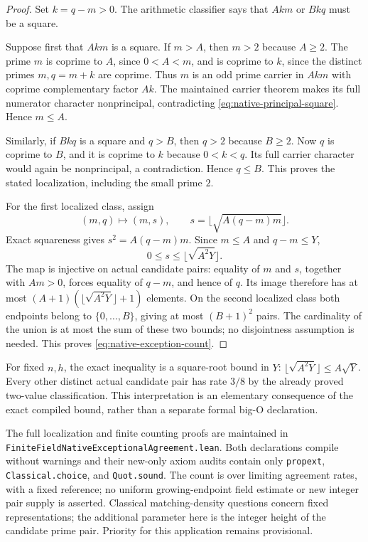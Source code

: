 \documentclass[11pt]{article}
\begin{document}
\begin{proof}
Set \(k=q-m>0\). The arithmetic classifier says that
\(Akm\) or \(Bkq\) must be a square.

Suppose first that \(Akm\) is a square. If \(m>A\), then \(m>2\)
because \(A\ge2\). The prime \(m\) is coprime to \(A\), since
\(0<A<m\), and is coprime to \(k\), since the distinct primes
\(m,q=m+k\) are coprime. Thus \(m\) is an odd prime carrier in
\(Akm\) with coprime complementary factor \(Ak\).
The maintained carrier theorem makes its full numerator character
nonprincipal, contradicting \eqref{eq:native-principal-square}.
Hence \(m\le A\).

Similarly, if \(Bkq\) is a square and \(q>B\), then \(q>2\)
because \(B\ge2\). Now \(q\) is coprime to \(B\), and it is
coprime to \(k\) because \(0<k<q\). Its full carrier character
would again be nonprincipal, a contradiction. Hence \(q\le B\).
This proves the stated localization, including the small prime \(2\).

For the first localized class, assign
\[
                  (m,q)\longmapsto(m,s),\qquad
                  s=\lfloor\sqrt{A(q-m)m}\rfloor .
\]
Exact squareness gives \(s^2=A(q-m)m\).
Since \(m\le A\) and \(q-m\le Y\),
\[
                    0\le s\le\lfloor\sqrt{A^2Y}\rfloor .
\]
The map is injective on actual candidate pairs: equality of \(m\)
and \(s\), together with \(Am>0\), forces equality of \(q-m\),
and hence of \(q\). Its image therefore has at most
\((A+1)(\lfloor\sqrt{A^2Y}\rfloor+1)\) elements.
On the second localized class both endpoints belong to
\(\{0,\ldots,B\}\), giving at most \((B+1)^2\) pairs.
The cardinality of the union is at most the sum of these two
bounds; no disjointness assumption is needed. This proves
\eqref{eq:native-exception-count}.
\end{proof}

For fixed \(n,h\), the exact inequality is a square-root bound in
\(Y\): \(\lfloor\sqrt{A^2Y}\rfloor\le A\sqrt Y\).
Every other distinct actual candidate pair has rate \(3/8\) by
the already proved two-value classification.
This interpretation is an elementary consequence of the exact
compiled bound, rather than a separate formal big-O declaration.

The full localization and finite counting proofs are maintained in
\texttt{FiniteFieldNativeExceptionalAgreement.\allowbreak lean}.
Both declarations compile without warnings and their new-only
axiom audits contain only \texttt{propext},
\texttt{Classical.choice}, and \texttt{Quot.sound}.
The count is over limiting agreement rates, with a fixed reference;
no uniform growing-endpoint field estimate or new integer pair
supply is asserted. Classical matching-density questions
\cite{WaljiMatchingDensities} concern fixed representations;
the additional parameter here is the integer height of the
candidate prime pair. Priority for this application remains provisional.
\end{document}

